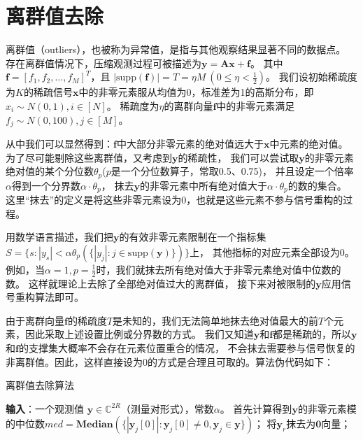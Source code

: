 \documentclass[AutoFakeBold]{LZUThesis}
\begin{document}
\section{离群值去除}
\label{removal}
离群值（outliers），也被称为异常值，是指与其他观察结果显著不同的数据点。
存在离群值情况下，压缩观测过程可被描述为$\mathbf{y} = \mathbf{Ax} + \mathbf{f}$。
其中$\mathbf{f} = [f_1, f_2, \dots, f_M]^T$，且
$\left | \mathrm{supp} (\mathbf{f}) \right | = T = \eta M \ (0 \leq \eta < \frac{1}{2})$。
我们设初始稀疏度为$K$的稀疏信号$\mathbf{x}$中的非零元素服从均值为0，标准差为1的高斯分布，即$x_i \sim N(0, 1), i \in [N]$。
稀疏度为$\eta$的离群向量$\mathbf{f}$中的非零元素满足$f_j \sim N(0, 100), j \in [M]$。

从中我们可以显然得到：$\mathbf{f}$中大部分非零元素的绝对值远大于$\mathbf{x}$中元素的绝对值。
为了尽可能剔除这些离群值，又考虑到$\mathbf{y}$的稀疏性，
我们可以尝试取$\mathbf{y}$的非零元素绝对值的某个分位数$\theta_p$($p$是一个分位数算子，常取0.5、0.75)，
并且设定一个倍率$\alpha$得到一个分界数$\alpha \cdot \theta_p$，
抹去$\mathbf{y}$的非零元素中所有绝对值大于$\alpha \cdot \theta_p$的数的集合。
这里“抹去”的定义是将这些非零元素设为0，也就是这些元素不参与信号重构的过程。

用数学语言描述，我们把$\mathbf{y}$的有效非零元素限制在一个指标集
$S = \{s: |y_s| < \alpha \theta_p (\{|y_j| : j \in \mathrm{supp} (\mathbf{y})\})\}$上，
其他指标的对应元素全部设为0。
例如，当$\alpha = 1, p = \frac{1}{2}$时，我们就抹去所有绝对值大于非零元素绝对值中位数的数。
这样就理论上去除了全部绝对值过大的离群值，
接下来对被限制的$\mathbf{y}$应用信号重构算法即可。

由于离群向量$\mathbf{f}$的稀疏度$T$是未知的，我们无法简单地抹去绝对值最大的前$T$个元素，因此采取上述设置比例或分界数的方式。
我们又知道$\mathbf{y}$和$\mathbf{f}$都是稀疏的，所以$\mathbf{y}$和$\mathbf{f}$的支撑集大概率不会存在元素位置重合的情况，
不会抹去需要参与信号恢复的非离群值。因此，这样直接设为0的方式是合理且可取的。算法伪代码如下：

\begin{algorithm}[H]
    \caption{离群值去除算法\label{Alg:outliers_removal}}
    \begin{algorithmic}[1]
        \State \textbf{输入}：一个观测值 $\mathbf{y} \in \mathbb{C}^{2R}$（测量对形式），常数$\alpha$。
        \State 首先计算得到$\mathbf{y}$的非零元素模的中位数$med = \mathbf{Median}(\{|\mathbf{y}_j[0]|: \mathbf{y}_j[0] \neq 0, \mathbf{y}_j \in \mathbf{y}\})$；
                \State 将$\mathbf{y}_r$抹去为$\mathbf{0}$向量；
            \EndIf
        \EndFor
    \end{algorithmic}
\end{algorithm}
\end{document}
